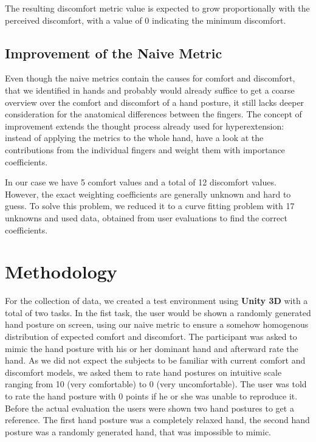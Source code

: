 \documentclass{sig-alternate-05-2015}
\begin{document}
The resulting discomfort metric value is expected to grow proportionally with the perceived discomfort, with a value of 0 indicating the minimum discomfort. 

\subsection{Improvement of the Naive Metric}

Even though the naive metrics contain the causes for comfort and discomfort, that we identified in hands and probably would already suffice to get a coarse overview over the comfort and discomfort of a hand posture, it still lacks deeper consideration for the anatomical differences between the fingers.
The concept of improvement extends the thought process already used for hyperextension: instead of applying the metrics to the whole hand, have a look at the contributions from the individual fingers and weight them with importance coefficients. 

In our case we have 5 comfort values and a total of 12 discomfort values. However, the exact weighting coefficients are generally unknown and hard to guess. To solve this problem, we reduced it to a curve fitting problem with 17 unknowns and used data, obtained from user evaluations to find the correct coefficients.

\section{Methodology}

For the collection of data, we created a test environment using \textbf{Unity 3D} with a total of two tasks. In the fist task, the user would be shown a randomly generated hand posture on screen, using our naive metric to ensure a somehow homogenous distribution of expected comfort and discomfort. The participant was asked to mimic the hand posture with his or her dominant hand and afterward rate the hand. As we did not expect the subjects to be familiar with current comfort and discomfort models, we asked them to rate hand postures on intuitive scale ranging from 10 (very comfortable) to 0 (very uncomfortable). The user was told to rate the hand posture with 0 points if he or she was unable to reproduce it. Before the actual evaluation the users were shown two hand postures to get a reference. The first hand posture was a completely relaxed hand, the second hand posture was a randomly generated hand, that was impossible to mimic.
\end{document}
